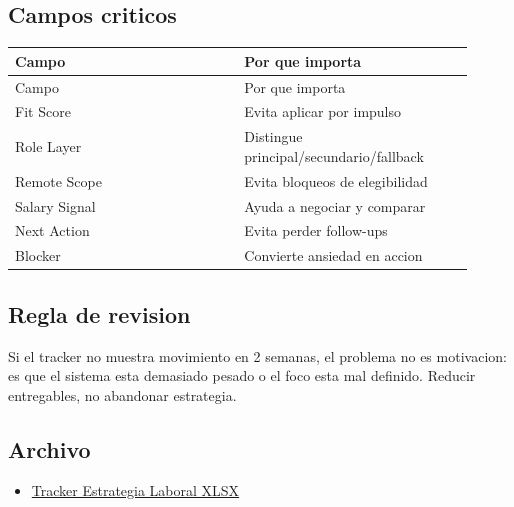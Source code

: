 \subsection{Campos criticos}


\begin{center}
\scriptsize
\begin{longtable}{>{\raggedright\arraybackslash}p{0.455\linewidth} >{\raggedright\arraybackslash}p{0.455\linewidth}}
\toprule
Campo & Por que importa \\
\midrule
\endfirsthead
\toprule
Campo & Por que importa \\
\midrule
\endhead
Fit Score & Evita aplicar por impulso \\
Role Layer & Distingue principal/secundario/fallback \\
Remote Scope & Evita bloqueos de elegibilidad \\
Salary Signal & Ayuda a negociar y comparar \\
Next Action & Evita perder follow-ups \\
Blocker & Convierte ansiedad en accion \\
\bottomrule
\end{longtable}
\end{center}



\subsection{Regla de revision}


Si el tracker no muestra movimiento en 2 semanas, el problema no es motivacion: es que el sistema esta demasiado pesado o el foco esta mal definido. Reducir entregables, no abandonar estrategia.


\subsection{Archivo}


\begin{itemize}
\item \href{file:///E:/Laboral/_roadmap_laboral/tracker/Tracker_Estrategia_Laboral_Alexander_v1.xlsx}{Tracker Estrategia Laboral XLSX}
\end{itemize}
